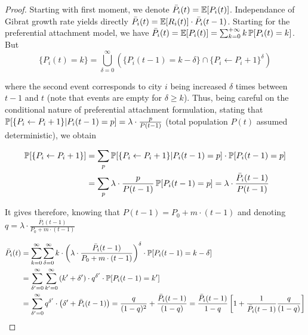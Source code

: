 \begin{proof}

Starting with first moment, we denote $\bar{P}_i(t)=\operatorname{\mathbb{E}}\!\left[P_i(t)\right]$. Independance of Gibrat growth rate yields directly $\bar{P}_i(t)=\operatorname{\mathbb{E}}\!\left[R_i(t)\right]\cdot \bar{P}_i(t-1)$. Starting for the preferential attachment model, we have $\bar{P}_i(t) = \operatorname{\mathbb{E}}\!\left[P_i(t)\right] = \sum_{k=0}^{+\infty}{k\operatorname{\mathbb{P}}\!\left[P_i(t)=k\right]}$. But
\[
\{P_i(t)=k\}=\bigcup_{\delta=0}^{\infty}{\left(\{P_i(t-1)=k-\delta\}\cap \{P_i\leftarrow P_i + 1\}^{\delta}\right)}
\]

where the second event corresponds to city $i$ being increased $\delta$ times between $t-1$ and $t$ (note that events are empty for $\delta \geq k$). Thus, being careful on the conditional nature of preferential attachment formulation, stating that $\operatorname{\mathbb{P}}\!\left[\{P_i\leftarrow P_i + 1\} | P_i(t-1)=p\right] = \lambda\cdot\frac{p}{P(t-1)}$ (total population $P(t)$ assumed deterministic), we obtain

\begin{equation*}
\begin{split}
\operatorname{\mathbb{P}}\!\left[\{P_i\leftarrow P_i + 1\}\right] & = \sum_{p}{\operatorname{\mathbb{P}}\!\left[\{P_i\leftarrow P_i + 1\} | P_i(t-1)=p\right]\cdot \operatorname{\mathbb{P}}\!\left[P_i(t-1)=p\right]}\\
&=\sum_{p}{\lambda\cdot\frac{p}{P(t-1)}\operatorname{\mathbb{P}}\!\left[P_i(t-1)=p\right]}=\lambda\cdot\frac{\bar{P}_i(t-1)}{P(t-1)}\\
\end{split}
\end{equation*}

It gives therefore, knowing that $P(t-1)=P_0 + m\cdot (t-1)$ and denoting $q=\lambda\cdot\frac{\bar{P}_i(t-1)}{P_0 + m\cdot (t-1)}$

\[
\begin{split}
\bar{P}_i(t) & =\sum_{k=0}^{\infty}{\sum_{\delta=0}^{\infty}{k\cdot \left(\lambda\cdot\frac{\bar{P}_i(t-1)}{P_0 + m\cdot (t-1)}\right)^{\delta}\cdot \operatorname{\mathbb{P}}\!\left[P_i(t-1)=k-\delta\right]}}\\
& = \sum_{\delta^{\prime}=0}^{\infty}{\sum_{k^{\prime}=0}^{\infty}{\left(k^\prime + \delta^{\prime}\right)\cdot q^{\delta^{\prime}} \cdot \operatorname{\mathbb{P}}\!\left[P_i(t-1)=k^\prime\right]}}\\
& = \sum_{\delta^{\prime}=0}^{\infty}{q^{\delta^{\prime}}\cdot \left(\delta^{\prime} + \bar{P}_i(t-1)\right)} = \frac{q}{(1-q)^2} + \frac{\bar{P}_i(t-1)}{(1-q)} = \frac{\bar{P}_i(t-1)}{1-q}\left[1 + \frac{1}{\bar{P}_i(t-1)}\frac{q}{(1-q)}\right]
\end{split}
\]




\end{proof}
